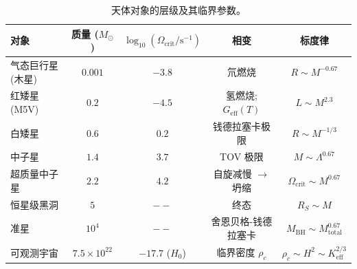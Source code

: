 \documentclass[11pt,a4paper]{article}
\begin{document}
	\begin{table}[htbp]
		\centering
		\caption{天体对象的层级及其临界参数。}
		\label{tab:hierarchy}
		\small
		\begin{tabular}{l c c c c}
			\toprule
			\textbf{对象} & \textbf{质量 (\(M_\odot\))} & \(\log_{10}(\Omega_{\mathrm{crit}}/\mathrm{s^{-1}})\) & \textbf{相变} & \textbf{标度律} \\
			\midrule
			气态巨行星 (木星) & \(0.001\) & \(-3.8\) & 氘燃烧 & \(R\sim M^{-0.67}\) \\
			红矮星 (M5V) & \(0.2\) & \(-4.5\) & 氢燃烧; \(G_{\mathrm{eff}}(T)\) & \(L\sim M^{2.3}\) \\
			白矮星 & \(0.6\) & \(0.2\) & 钱德拉塞卡极限 & \(R\sim M^{-1/3}\) \\
			中子星 & \(1.4\) & \(3.7\) & TOV 极限 & \(M\sim\Lambda^{0.67}\) \\
			超质量中子星 & \(2.2\) & \(4.2\) & 自旋减慢 \(\to\) 坍缩 & \(\Omega_{\mathrm{crit}}\sim M^{0.67}\) \\
			恒星级黑洞 & \(5\) & \(--\) & 终态 & \(R_S\sim M\) \\
			准星 & \(10^4\) & \(--\) & 舍恩贝格-钱德拉塞卡 & \(M_{\mathrm{BH}}\sim M_{\mathrm{total}}^{0.67}\) \\
			可观测宇宙 & \(7.5\times10^{22}\) & \(-17.7\) (\(H_0\)) & 临界密度 \(\rho_c\) & \(\rho_c\sim H^2\sim K_{\mathrm{eff}}^{2/3}\) \\
			\bottomrule
		\end{tabular}
	\end{table}
	
\end{document}
